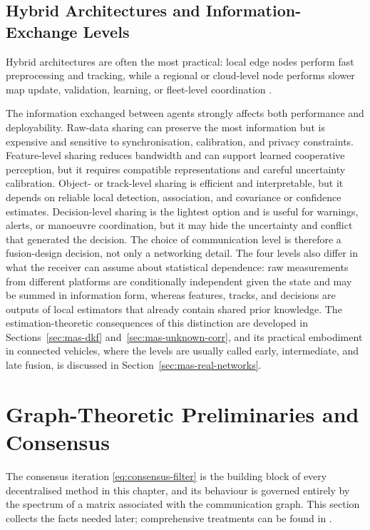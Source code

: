 \subsection{Hybrid Architectures and Information-Exchange Levels}
\label{subsec:mas-levels}

Hybrid architectures are often the most practical: local edge nodes perform fast preprocessing and tracking, while a regional or cloud-level node performs slower map update, validation, learning, or fleet-level coordination \cite{deng_edge_2021,lim_federated_2020}.

The information exchanged between agents strongly affects both performance and deployability. Raw-data sharing can preserve the most information but is expensive and sensitive to synchronisation, calibration, and privacy constraints. Feature-level sharing reduces bandwidth and can support learned cooperative perception, but it requires compatible representations and careful uncertainty calibration. Object- or track-level sharing is efficient and interpretable, but it depends on reliable local detection, association, and covariance or confidence estimates. Decision-level sharing is the lightest option and is useful for warnings, alerts, or manoeuvre coordination, but it may hide the uncertainty and conflict that generated the decision. The choice of communication level is therefore a fusion-design decision, not only a networking detail. The four levels also differ in what the receiver can assume about statistical dependence: raw measurements from different platforms are conditionally independent given the state and may be summed in information form, whereas features, tracks, and decisions are outputs of local estimators that already contain shared prior knowledge. The estimation-theoretic consequences of this distinction are developed in Sections~\ref{sec:mas-dkf} and~\ref{sec:mas-unknown-corr}, and its practical embodiment in connected vehicles, where the levels are usually called early, intermediate, and late fusion, is discussed in Section~\ref{sec:mas-real-networks}.

\section{Graph-Theoretic Preliminaries and Consensus}
\label{sec:mas-graph-theory}

The consensus iteration \eqref{eq:consensus-filter} is the building block of every decentralised method in this chapter, and its behaviour is governed entirely by the spectrum of a matrix associated with the communication graph. This section collects the facts needed later; comprehensive treatments can be found in \cite{olfatisaber2007_consensus,ren2005_consensus}.

